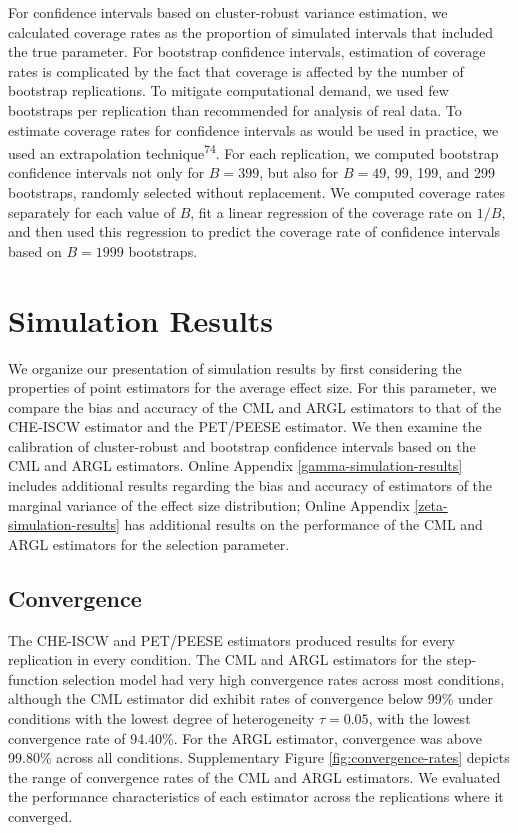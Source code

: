 \documentclass[
  american,
  man, donotrepeattitle,floatsintext]{apa7}
\begin{document}
For confidence intervals based on cluster-robust variance estimation, we calculated coverage rates as the proportion of simulated intervals that included the true parameter.
For bootstrap confidence intervals, estimation of coverage rates is complicated by the fact that coverage is affected by the number of bootstrap replications.
To mitigate computational demand, we used few bootstraps per replication than recommended for analysis of real data.
To estimate coverage rates for confidence intervals as would be used in practice, we used an extrapolation technique\textsuperscript{74}.
For each replication, we computed bootstrap confidence intervals not only for \(B = 399\), but also for \(B = 49\), 99, 199, and 299 bootstraps, randomly selected without replacement.
We computed coverage rates separately for each value of \(B\), fit a linear regression of the coverage rate on \(1 / B\), and then used this regression to predict the coverage rate of confidence intervals based on \(B = 1999\) bootstraps.

\section{Simulation Results}\label{simulation-results}

We organize our presentation of simulation results by first considering the properties of point estimators for the average effect size.
For this parameter, we compare the bias and accuracy of the CML and ARGL estimators to that of the CHE-ISCW estimator and the PET/PEESE estimator.
We then examine the calibration of cluster-robust and bootstrap confidence intervals based on the CML and ARGL estimators.
Online Appendix \ref{gamma-simulation-results} includes additional results regarding the bias and accuracy of estimators of the marginal variance of the effect size distribution; Online Appendix \ref{zeta-simulation-results} has additional results on the performance of the CML and ARGL estimators for the selection parameter.

\subsection{Convergence}\label{convergence}

The CHE-ISCW and PET/PEESE estimators produced results for every replication in every condition.
The CML and ARGL estimators for the step-function selection model had very high convergence rates across most conditions, although the CML estimator did exhibit rates of convergence below 99\% under conditions with the lowest degree of heterogeneity \(\tau = 0.05\), with the lowest convergence rate of 94.40\%.
For the ARGL estimator, convergence was above 99.80\% across all conditions.
Supplementary Figure \ref{fig:convergence-rates} depicts the range of convergence rates of the CML and ARGL estimators.
We evaluated the performance characteristics of each estimator across the replications where it converged.
\end{document}
